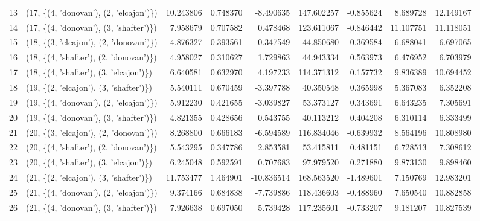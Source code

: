 \begin{tabular}{llrrrrrrr}
13 &  (17, \{(4, 'donovan'), (2, 'elcajon')\}) &  10.243806 &   0.748370 &  -8.490635 &  147.602257 & -0.855624 &   8.689728 &  12.149167 \\
14 &  (17, \{(4, 'donovan'), (3, 'shafter')\}) &   7.958679 &   0.707582 &   0.478468 &  123.611067 & -0.846442 &  11.107751 &  11.118051 \\
15 &  (18, \{(3, 'elcajon'), (2, 'donovan')\}) &   4.876327 &   0.393561 &   0.347549 &   44.850680 &  0.369584 &   6.688041 &   6.697065 \\
16 &  (18, \{(4, 'shafter'), (2, 'donovan')\}) &   4.958027 &   0.310627 &   1.729863 &   44.943334 &  0.563973 &   6.476952 &   6.703979 \\
17 &  (18, \{(4, 'shafter'), (3, 'elcajon')\}) &   6.640581 &   0.632970 &   4.197233 &  114.371312 &  0.157732 &   9.836389 &  10.694452 \\
18 &  (19, \{(2, 'elcajon'), (3, 'shafter')\}) &   5.540111 &   0.670459 &  -3.397788 &   40.350548 &  0.365998 &   5.367083 &   6.352208 \\
19 &  (19, \{(4, 'donovan'), (2, 'elcajon')\}) &   5.912230 &   0.421655 &  -3.039827 &   53.373127 &  0.343691 &   6.643235 &   7.305691 \\
20 &  (19, \{(4, 'donovan'), (3, 'shafter')\}) &   4.821355 &   0.428656 &   0.543755 &   40.113212 &  0.404208 &   6.310114 &   6.333499 \\
21 &  (20, \{(3, 'elcajon'), (2, 'donovan')\}) &   8.268800 &   0.666183 &  -6.594589 &  116.834046 & -0.639932 &   8.564196 &  10.808980 \\
22 &  (20, \{(4, 'shafter'), (2, 'donovan')\}) &   5.543295 &   0.347786 &   2.853581 &   53.415811 &  0.481151 &   6.728513 &   7.308612 \\
23 &  (20, \{(4, 'shafter'), (3, 'elcajon')\}) &   6.245048 &   0.592591 &   0.707683 &   97.979520 &  0.271880 &   9.873130 &   9.898460 \\
24 &  (21, \{(2, 'elcajon'), (3, 'shafter')\}) &  11.753477 &   1.464901 & -10.836514 &  168.563520 & -1.489601 &   7.150769 &  12.983201 \\
25 &  (21, \{(4, 'donovan'), (2, 'elcajon')\}) &   9.374166 &   0.684838 &  -7.739886 &  118.436603 & -0.488960 &   7.650540 &  10.882858 \\
26 &  (21, \{(4, 'donovan'), (3, 'shafter')\}) &   7.926638 &   0.697050 &   5.739428 &  117.235601 & -0.733207 &   9.181207 &  10.827539 \\
\bottomrule
\end{tabular}
